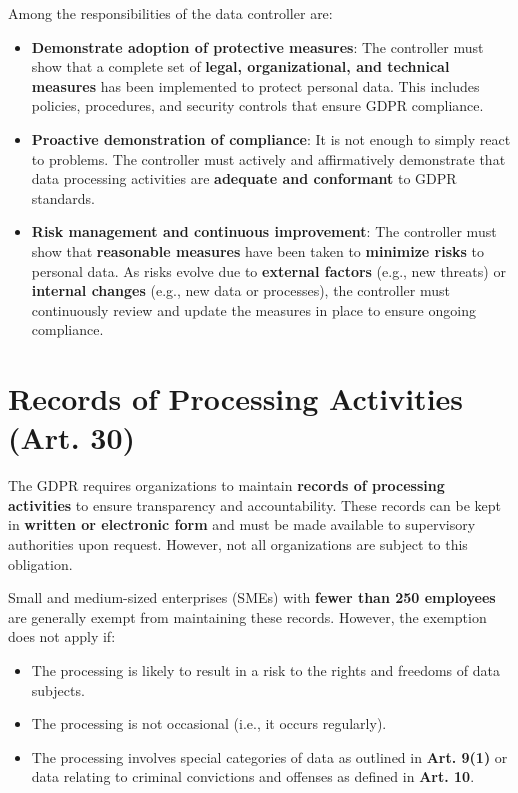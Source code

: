 Among the responsibilities of the data controller are:
\begin{itemize}
  \item \textbf{Demonstrate adoption of protective measures}:  The
    controller must show that a complete set of \textbf{legal,
    organizational, and technical measures} has been implemented to
    protect personal data. This includes policies, procedures, and
    security controls that ensure GDPR compliance.  
  \item \textbf{Proactive demonstration of compliance}:  It is not
    enough to simply react to problems. The controller must actively
    and affirmatively demonstrate that data processing activities are
    \textbf{adequate and conformant} to GDPR standards.  
  \item \textbf{Risk management and continuous improvement}:  The
    controller must show that \textbf{reasonable measures} have been
    taken to \textbf{minimize risks} to personal data. As risks evolve
    due to \textbf{external factors} (e.g., new threats) or
    \textbf{internal changes} (e.g., new data or processes), the
    controller must continuously review and update the measures in
    place to ensure ongoing compliance.  
\end{itemize}

\section{Records of Processing Activities (Art. 30)}
The GDPR requires organizations to maintain \textbf{records of
processing activities} to ensure transparency and accountability.
These records can be kept in \textbf{written or electronic form} and
must be made available to supervisory authorities upon request.
However, not all organizations are subject to this obligation. 

Small and medium-sized enterprises (SMEs) with \textbf{fewer than 250
employees} are generally exempt from maintaining these records.
However, the exemption does not apply if:  
\begin{itemize}
  \item The processing is likely to result in a risk to the rights and
    freedoms of data subjects.  
  \item The processing is not occasional (i.e., it occurs regularly).  
  \item The processing involves special categories of data as outlined
    in \textbf{Art. 9(1)} or data relating to criminal convictions and
    offenses as defined in \textbf{Art. 10}.  
\end{itemize}

